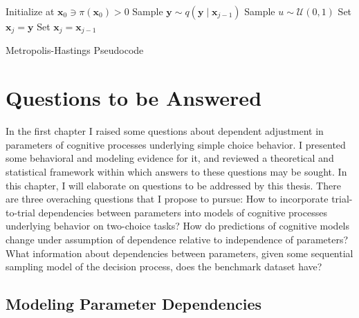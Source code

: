 \documentclass[12pt]{report}
\begin{document}
\begin{algorithm}
\centering
\begin{algorithmic}
\State Initialize at $\boldsymbol{x}_0 \ni 						   \pi(\boldsymbol{x}_0) > 0$
  \State Sample $\boldsymbol{y} \sim q(\boldsymbol{y} \mid 			 \boldsymbol{x}_{j-1})$
  \State Sample $u \sim \mathcal{U}(0, 1)$
    \State Set $\boldsymbol{x}_j = \boldsymbol{y}$
  \Else 
    \State Set $\boldsymbol{x}_j = \boldsymbol{x}_{j-1}$
  \EndIf
\EndFor
\end{algorithmic}
\caption{\label{fig:mh} Metropolis-Hastings Pseudocode}
\end{algorithm}

\chapter{Questions to be Answered}

In the first chapter I raised some questions about dependent adjustment in parameters of cognitive processes underlying simple choice behavior. I presented some behavioral and modeling evidence for it, and reviewed a theoretical and statistical framework within which answers to these questions may be sought.  In this chapter, I will elaborate on questions to be addressed by this thesis. There are three overaching questions that I propose to pursue: How to incorporate trial-to-trial dependencies between parameters into models of cognitive processes underlying behavior on two-choice tasks? How do predictions of cognitive models change under assumption of dependence relative to independence of parameters? What information about dependencies between parameters, given some sequential sampling model of the decision process, does the benchmark dataset have?

\section{Modeling Parameter Dependencies}
\end{document}
